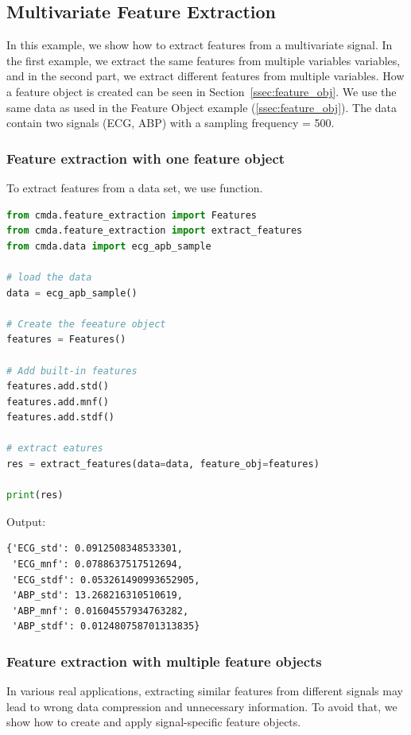 \documentclass{article}
\begin{document}
\subsection{Multivariate Feature Extraction}

In this example, we show how to extract features from a multivariate signal. In the first example, we extract the same features from multiple variables variables, and in the second part, we extract different features from multiple variables. How a feature object is created can be seen in Section~\ref{ssec:feature_obj}. We use the same data as used in the Feature Object example (\ref{ssec:feature_obj}). The data contain two signals (ECG, ABP) with a sampling frequency = 500.

\subsubsection{Feature extraction with one feature object}
To extract features from a data set, we use  function. 

\begin{lstlisting}[language=Python, caption=Multivariate feature extraction using one feature object]
from cmda.feature_extraction import Features
from cmda.feature_extraction import extract_features
from cmda.data import ecg_apb_sample

# load the data
data = ecg_apb_sample()

# Create the feeature object
features = Features()

# Add built-in features
features.add.std()
features.add.mnf()
features.add.stdf()

# extract eatures
res = extract_features(data=data, feature_obj=features)

print(res)
\end{lstlisting}

Output:
\begin{lstlisting}
{'ECG_std': 0.0912508348533301,
 'ECG_mnf': 0.0788637517512694,
 'ECG_stdf': 0.053261490993652905,
 'ABP_std': 13.268216310510619,
 'ABP_mnf': 0.01604557934763282,
 'ABP_stdf': 0.012480758701313835}
\end{lstlisting}

\subsubsection{Feature extraction with multiple feature objects}
In various real applications, extracting similar features from different signals may lead to wrong data compression and unnecessary information. To avoid that, we show how to create and apply signal-specific feature objects.
\end{document}

